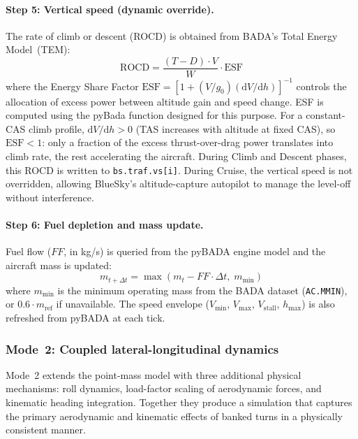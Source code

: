 \paragraph{Step 5: Vertical speed (dynamic override).}
The rate of climb or descent (ROCD) is obtained from BADA's Total Energy Model~(TEM):
\begin{equation}
    \text{ROCD} = \frac{(T - D) \cdot V}{W} \cdot \text{ESF}
    \label{eq:rocd}
\end{equation}
where the Energy Share Factor $\text{ESF} = [1 + (V / g_0)(\mathrm{d}V/\mathrm{d}h)]^{-1}$ controls the allocation of excess power between altitude gain and speed change. ESF is computed using the pyBada function designed for this purpose.  For a constant-CAS climb profile, $\mathrm{d}V/\mathrm{d}h > 0$ (TAS increases with altitude at fixed CAS), so $\text{ESF} < 1$: only a fraction of the excess thrust-over-drag power translates into climb rate, the rest accelerating the aircraft.  During Climb and Descent phases, this ROCD is written to \texttt{bs.traf.vs[i]}.  During Cruise, the vertical speed is not overridden, allowing BlueSky's altitude-capture autopilot to manage the level-off without interference.

\paragraph{Step 6: Fuel depletion and mass update.}
Fuel flow ($FF$, in kg/s) is queried from the pyBADA engine model and the aircraft mass is updated:
\begin{equation}
    m_{t+\Delta t} = \max\!\left(m_t - FF \cdot \Delta t,\; m_{\min}\right)
\end{equation}
where $m_{\min}$ is the minimum operating mass from the BADA dataset (\texttt{AC.MMIN}), or $0.6 \cdot m_{\text{ref}}$ if unavailable.  The speed envelope ($V_{\min}$, $V_{\max}$, $V_{\text{stall}}$, $h_{\max}$) is also refreshed from pyBADA at each tick.

\subsubsection{Mode~2: Coupled lateral-longitudinal dynamics}
\label{sec:mode2}

Mode~2 extends the point-mass model with three additional physical mechanisms: roll dynamics, load-factor scaling of aerodynamic forces, and kinematic heading integration.  Together they produce a simulation that captures the primary aerodynamic and kinematic effects of banked turns in a physically consistent manner.


